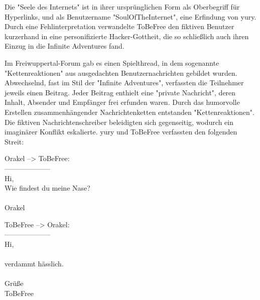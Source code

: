 Die "Seele des Internets" ist in ihrer ursprünglichen Form als Oberbegriff für Hyperlinks, und als Benutzername "SoulOfTheInternet", eine Erfindung von yury. Durch eine Fehlinterpretation verwandelte ToBeFree den fiktiven Benutzer kurzerhand in eine personifizierte Hacker-Gottheit, die so schließlich auch ihren Einzug in die Infinite Adventures fand.

Im Freiwuppertal-Forum gab es einen Spielthread, in dem sogenannte "Kettenreaktionen" aus ausgedachten Benutzernachrichten gebildet wurden. Abwechselnd, fast im Stil der "Infinite Adventures", verfassten die Teilnehmer jeweils einen Beitrag. Jeder Beitrag enthielt eine "private Nachricht", deren Inhalt, Absender und Empfänger frei erfunden waren. Durch das humorvolle Erstellen zusammenhängender Nachrichtenketten entstanden "Kettenreaktionen". Die fiktiven Nachrichtenschreiber beleidigten sich gegenseitig, wodurch ein imaginärer Konflikt eskalierte. yury und ToBeFree verfassten den folgenden Streit:


\noindent \parbox{\textwidth}{

    \begin{footnotesize}
    \begin{itshape}

\noindent Orakel --> ToBeFree:\\
\noindent --------------------\\
\noindent Hi,\\
\noindent Wie findest du meine Nase?\\
\noindent ~\\
\noindent Orakel\\

    \end{itshape}
    \end{footnotesize}

}

\noindent \parbox{\textwidth}{

    \begin{footnotesize}
    \begin{itshape}
    \begin{flushright}

\noindent ToBeFree --> Orakel:\\
\noindent --------------------\\
\noindent Hi,\\
\noindent ~\\
\noindent verdammt hässlich.\\
\noindent ~\\
\noindent Grüße\\
\noindent ToBeFree\\

    \end{flushright}
    \end{itshape}
    \end{footnotesize}

}

